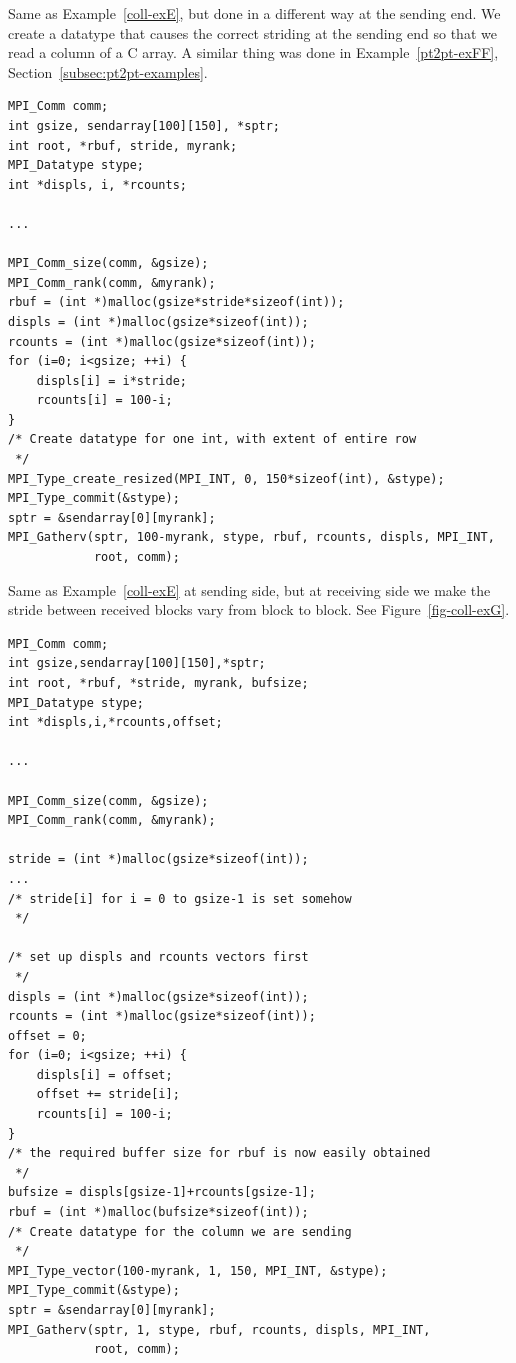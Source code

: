 \begin{example}
\label{coll-exF}
%
Same as Example~\ref{coll-exE}, but done in a different way at the sending end.
We create a datatype that causes the correct striding at the
sending end so
that
we read a column of a C array.
A similar thing was done in Example~\ref{pt2pt-exFF},
Section~\ref{subsec:pt2pt-examples}.

\begin{lstlisting}[language={[MPI]C}]
MPI_Comm comm;
int gsize, sendarray[100][150], *sptr;
int root, *rbuf, stride, myrank;
MPI_Datatype stype;
int *displs, i, *rcounts;

...

MPI_Comm_size(comm, &gsize);
MPI_Comm_rank(comm, &myrank);
rbuf = (int *)malloc(gsize*stride*sizeof(int));
displs = (int *)malloc(gsize*sizeof(int));
rcounts = (int *)malloc(gsize*sizeof(int));
for (i=0; i<gsize; ++i) {
    displs[i] = i*stride;
    rcounts[i] = 100-i;
}
/* Create datatype for one int, with extent of entire row
 */
MPI_Type_create_resized(MPI_INT, 0, 150*sizeof(int), &stype);
MPI_Type_commit(&stype);
sptr = &sendarray[0][myrank];
MPI_Gatherv(sptr, 100-myrank, stype, rbuf, rcounts, displs, MPI_INT,
            root, comm);
\end{lstlisting}
\end{example}

\begin{example}
\label{coll-exG}
%
Same as Example~\ref{coll-exE} at sending side, but
at receiving side we make the
stride between received blocks vary from block to block.
See Figure~\ref{fig-coll-exG}.

\begin{lstlisting}[language={[MPI]C}]
MPI_Comm comm;
int gsize,sendarray[100][150],*sptr;
int root, *rbuf, *stride, myrank, bufsize;
MPI_Datatype stype;
int *displs,i,*rcounts,offset;

...

MPI_Comm_size(comm, &gsize);
MPI_Comm_rank(comm, &myrank);

stride = (int *)malloc(gsize*sizeof(int));
...
/* stride[i] for i = 0 to gsize-1 is set somehow
 */

/* set up displs and rcounts vectors first
 */
displs = (int *)malloc(gsize*sizeof(int));
rcounts = (int *)malloc(gsize*sizeof(int));
offset = 0;
for (i=0; i<gsize; ++i) {
    displs[i] = offset;
    offset += stride[i];
    rcounts[i] = 100-i;
}
/* the required buffer size for rbuf is now easily obtained
 */
bufsize = displs[gsize-1]+rcounts[gsize-1];
rbuf = (int *)malloc(bufsize*sizeof(int));
/* Create datatype for the column we are sending
 */
MPI_Type_vector(100-myrank, 1, 150, MPI_INT, &stype);
MPI_Type_commit(&stype);
sptr = &sendarray[0][myrank];
MPI_Gatherv(sptr, 1, stype, rbuf, rcounts, displs, MPI_INT,
            root, comm);
\end{lstlisting}
\end{example}

